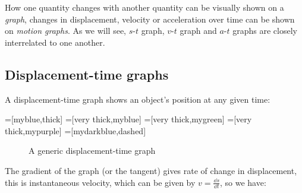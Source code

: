 How one quantity changes with another quantity can be visually shown on a \emph{graph}, changes in displacement, velocity or acceleration over time can be shown on \emph{motion graphs}. As we will see, $s$-$t$ graph, $v$-$t$ graph and $a$-$t$ graphs are closely interrelated to one another.

\subsection{Displacement-time graphs}

A displacement-time graph shows an object's position at any given time:

=[myblue,thick]
=[very thick,myblue]
=[very thick,mygreen]
=[very thick,mypurple]
=[mydarkblue,dashed]

\def\tick#1#2{\draw[thick] (#1) ++ (#2:0.1) --++ (#2-180:0.2)}
\def\tlabel{$t\,\left[\text{s}\right]$}
\def\vlabel{$d\,\left[\text{m}\right]$}
\def\alabel{$a\,\left[\si{m/s^2}\right]$}

\begin{figure}
    \centering
    \def\xmax{5.5} %
\def\ymax{3.0} %
\def\tmax{16} %
    \caption{A generic displacement-time graph}
    \label{fig:enter-label}
\end{figure}
The gradient of the graph (or the tangent) gives rate of change in displacement, this is instantaneous velocity, which can be given by $v = \frac{\dd s}{\dd t}$, so we have:

